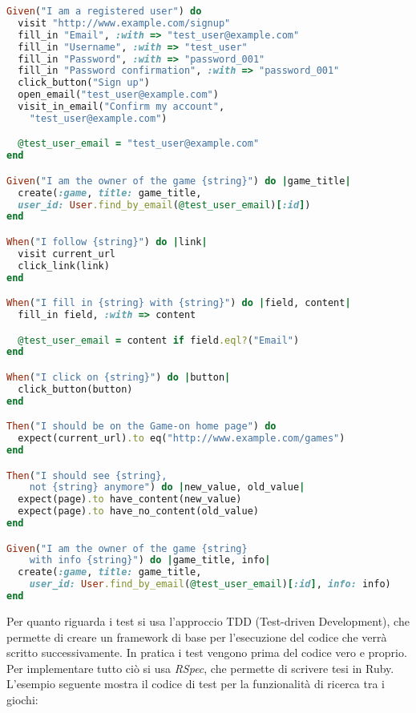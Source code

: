\begin{lstlisting}[language=Ruby]
Given("I am a registered user") do
  visit "http://www.example.com/signup"
  fill_in "Email", :with => "test_user@example.com"
  fill_in "Username", :with => "test_user"
  fill_in "Password", :with => "password_001"
  fill_in "Password confirmation", :with => "password_001"
  click_button("Sign up")
  open_email("test_user@example.com")
  visit_in_email("Confirm my account", 
    "test_user@example.com")

  @test_user_email = "test_user@example.com"
end

Given("I am the owner of the game {string}") do |game_title|
  create(:game, title: game_title, 
  user_id: User.find_by_email(@test_user_email)[:id])
end

When("I follow {string}") do |link|
  visit current_url
  click_link(link)
end

When("I fill in {string} with {string}") do |field, content|
  fill_in field, :with => content

  @test_user_email = content if field.eql?("Email")
end

When("I click on {string}") do |button|
  click_button(button)
end

Then("I should be on the Game-on home page") do
  expect(current_url).to eq("http://www.example.com/games")
end

Then("I should see {string}, 
    not {string} anymore") do |new_value, old_value|
  expect(page).to have_content(new_value)
  expect(page).to have_no_content(old_value)
end

Given("I am the owner of the game {string} 
    with info {string}") do |game_title, info|
  create(:game, title: game_title, 
    user_id: User.find_by_email(@test_user_email)[:id], info: info)
end
\end{lstlisting}

Per quanto riguarda i test si usa l'approccio TDD (Test-driven Development), che permette di creare un framework di base per l'esecuzione del codice che verrà scritto successivamente. In pratica i test vengono prima del codice vero e proprio. Per implementare tutto ciò si usa \emph{RSpec}, che permette di scrivere tesi in Ruby.\\

L'esempio seguente mostra il codice di test per la funzionalità di ricerca tra i giochi:

